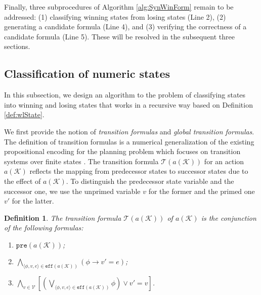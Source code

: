 \documentclass[review]{elsarticle}
\newcommand{\tuple}[1]{\langle {#1} \rangle}
\newcommand{\actparm}{\mathcal{K}}
\newcommand{\trans}{\mathcal{T}}
\newcommand{\pre}{\mathtt{pre}}
\newcommand{\eff}{\mathtt{eff}}
\newcommand{\con}{\phi}
\newcommand{\var}{\mathcal{V}}
\newtheorem{definition}{Definition}
\begin{document}
        Finally, three subprocedures of Algorithm \ref{alg:SynWinForm} remain to be addressed: 
        (1) classifying winning states from losing states (Line 2),
        (2) generating a candidate formula (Line 4), and 
        (3) verifying the correctness of a candidate formula (Line 5).
        These will be resolved in the subsequent three sections.
        
    \subsection{Classification of numeric states}
    In this subsection, we design an algorithm to the problem of classifying states into winning and losing states that works in a recursive way based on Definition \ref{def:wlState}.
    

    We first provide the notion of \textit{transition formulas} and \textit{global transition formulas}.
    The definition of transition formulas is a numerical generalization of the existing propositional encoding for the planning problem which focuses on transition systems over finite states \cite{HofB2006,Rin2012}.
    The transition formula $\trans(a(\actparm))$ for an action $a(\actparm)$ reflects the mapping from predecessor states to successor states due to the effect of $a(\actparm)$.
    To distinguish the predecessor state variable and the successor one, we use the unprimed variable $v$ for the former and the primed one $v'$ for the latter.
    
    \begin{definition}\label{def:transForm} \rm	
    	The transition formula $\trans(a(\actparm))$ of $a(\actparm)$ is the conjunction of the following formulas: 
    	\begin{enumerate}
    		\item $\pre(a(\actparm))$;
    		\item $\bigwedge_{\tuple{\con, v, e} \in \eff(a(\actparm))} (\con \rightarrow v' = e)$;
    		\item $\bigwedge_{v \in \var} [(\bigvee_{\tuple{\con, v, e} \in \eff(a(\actparm))} \con) \lor v' = v]$.
    	\end{enumerate}
    \end{definition}
    
\end{document}
